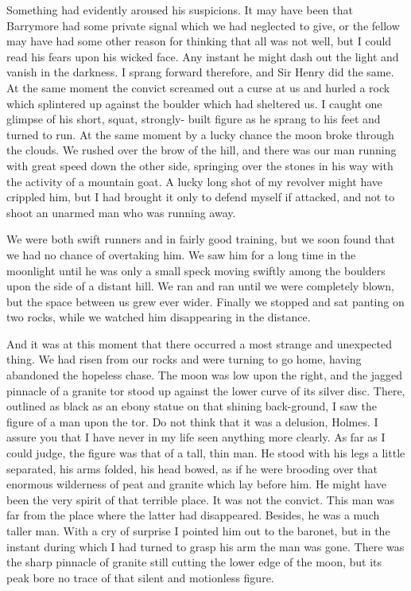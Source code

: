 \documentclass[paper=5.5in:8.5in,BCOR=7mm,twoside,DIV=calc,12pt,usegeometry,openany,chapterprefix,endperiod,headings=big]{scrbook} %
\begin{document}
Something had evidently aroused his suspicions. It may have been that Barrymore had some private signal which we had neglected to give, or the fellow may have had some other reason for thinking that all was not well, but I could read his fears upon his wicked face. Any instant he might dash out the light and vanish in the darkness. I sprang forward therefore, and Sir Henry did the same. At the same moment the convict screamed out a curse at us and hurled a rock which splintered up against the boulder which had sheltered us. I caught one glimpse of his short, squat, strongly- built figure as he sprang to his feet and turned to run. At the same moment by a lucky chance the moon broke through the clouds. We rushed over the brow of the hill, and there was our man running with great speed down the other side, springing over the stones in his way with the activity of a mountain goat. A lucky long shot of my revolver might have crippled him, but I had brought it only to defend myself if attacked, and not to shoot an unarmed man who was running away.

We were both swift runners and in fairly good training, but we soon found that we had no chance of overtaking him. We saw him for a long time in the moonlight until he was only a small speck moving swiftly among the boulders upon the side of a distant hill. We ran and ran until we were completely blown, but the space between us grew ever wider. Finally we stopped and sat panting on two rocks, while we watched him disappearing in the distance.



And it was at this moment that there occurred a most strange and unexpected thing. We had risen from our rocks and were turning to go home, having abandoned the hopeless chase. The moon was low upon the right, and the jagged pinnacle of a granite tor stood up against the lower curve of its silver disc. There, outlined as black as an ebony statue on that shining back-ground, I saw the figure of a man upon the tor. Do not think that it was a delusion, Holmes. I assure you that I have never in my life seen anything more clearly. As far as I could judge, the figure was that of a tall, thin man. He stood with his legs a little separated, his arms folded, his head bowed, as if he were brooding over that enormous wilderness of peat and granite which lay before him. He might have been the very spirit of that terrible place. It was not the convict. This man was far from the place where the latter had disappeared. Besides, he was a much taller man. With a cry of surprise I pointed him out to the baronet, but in the instant during which I had turned to grasp his arm the man was gone. There was the sharp pinnacle of granite still cutting the lower edge of the moon, but its peak bore no trace of that silent and motionless figure.
\end{document}
